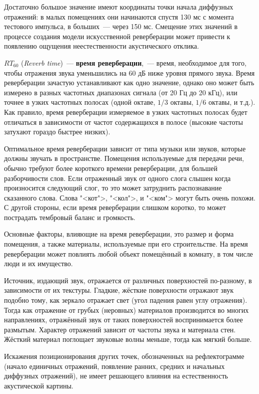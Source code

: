 \documentclass[oneside, final, 14pt]{extreport}
\begin{document}
Достаточно большое значение имеют координаты точки начала диффузных отражений: в малых помещениях они начинаются спустя 130 мс с момента тестового импульса, в больших~--- через 150 мс. Смещение этих значений в процессе создания модели искусственной реверберации может привести к появлению ощущения неестественности акустического отклика.

$RT_{60}$ (\emph{Reverb time})~--- \textbf{время реверберации},~--- время, необходимое для того, чтобы отражения звука уменьшились на 60 дБ ниже уровня прямого звука. Время реверберации зачастую устанавливают как одно значение, однако оно может быть измерено в разных частотных диапазонах сигнала (от 20 Гц до 20 кГц), или точнее в узких частотных полосах (одной октаве, $1/3$ октавы, $1/6$ октавы, и т.д.). Как правило, время реверберации измеряемое в узких частотных полосах будет отличаться в зависимости от частот содержащихся в полосе (высокие частоты затухают гораздо быстрее низких).

Оптимальное время реверберации зависит от типа музыки или звуков, которые должны звучать в пространстве. Помещения используемые для передачи речи, обычно требуют более короткого времени реверберации, для большей разборчивости слов. Если отраженный звук от одного слога слышен когда произносится следующий слог, то это может затруднить распознавание сказанного слова. Слова "<кот">, "<кол">, и "<ком"> могут быть очень похожи. С другой стороны, если время реверберации слишком коротко, то может пострадать тембровый баланс и громкость.

Основные факторы, влияющие на время реверберации, это размер и форма помещения, а также материалы, используемые при его строительстве. На время реверберации может повлиять любой объект помещённый в комнату, в том числе люди и их имущество.

Источник, издающий звук, отражается от различных поверхностей по-разному, в зависимости от их текстуры. Гладкие, жёсткие поверхности отражают звук подобно тому, как зеркало отражает свет (угол падения равен углу отражения). Тогда как отражение от грубых (неровных) материалов производится во многих направлениях, отражённый звук от таких поверхностей воспринимается более размытым. Характер отражений зависит от частоты звука и материала стен. Жёсткий материал поглощает звуковые волны меньше, тогда как мягкий больше.

Искажения позиционирования других точек, обозначенных на рефлектограмме (начало единичных отражений, появление ранних, средних и начальных диффузных отражений), не имеет решающего влияния на естественность акустической картины.
\end{document}
